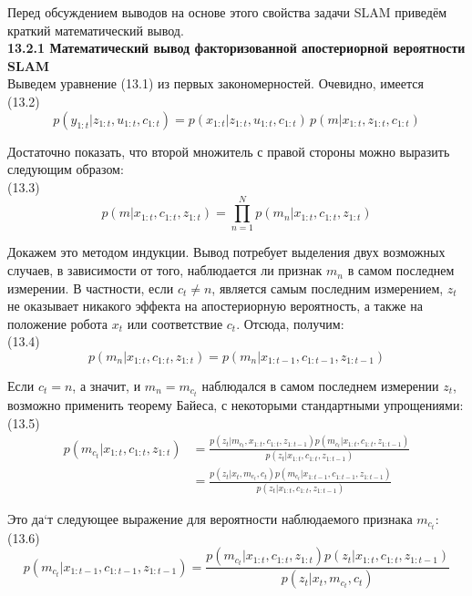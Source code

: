 \documentclass[10pt,a4paper]{article}
\begin{document}
Перед обсуждением выводов на основе этого свойства задачи SLAM приведём краткий математический вывод.\\

\textbf{13.2.1	Математический вывод факторизованной апостериорной вероятности SLAM }\\

Выведем уравнение (13.1) из первых закономерностей. Очевидно, имеется\\

(13.2)
$$p(y_{1:t}|z_{1:t},u_{1:t},c_{1:t})=p(x_{1:t}|z_{1:t},u_{1:t},c_{1:t})\,p(m|x_{1:t},z_{1:t},c_{1:t})$$

Достаточно показать, что второй множитель с правой стороны можно выразить следующим образом:\\

(13.3)
$$p(m|x_{1:t},c_{1:t},z_{1:t})=\prod_{n=1}^Np(m_n|x_{1:t},c_{1:t},z_{1:t})$$

Докажем это методом индукции. Вывод потребует выделения двух возможных случаев, в зависимости от того, наблюдается ли признак $m_n$ в самом последнем измерении. В частности, если $c_t\neq n$, является самым последним измерением, $z_t$ не оказывает никакого эффекта на апостериорную вероятность, а также на положение робота $x_t$ или соответствие $c_t$. Отсюда, получим:\\

(13.4)
$$p(m_n|x_{1:t},c_{1:t},z_{1:t})=p(m_n|x_{1:t-1},c_{1:t-1},z_{1:t-1})$$

Если $c_t=n$, а  значит, и $m_n = m_{c_t}$ наблюдался в самом последнем измерении $z_t$, возможно применить теорему Байеса, с некоторыми стандартными упрощениями:\\

(13.5)
\begin{equation*}
\begin{split}
p(m_{c_t}|x_{1:t},c_{1:t},z_{1:t})&=\frac{p(z_t|m_{c_t},x_{1:t},c_{1:t},z_{1:t-1})p(m_{c_t}|x_{1:t},c_{1:t},z_{1:t-1})}{p(z_t|x_{1:t},c_{1:t},z_{1:t-1})}\\
&=\frac{p(z_t|x_t,m_{c_t},c_t)p(m_{c_t}|x_{1:t-1},c_{1:t-1},z_{1:t-1})}{p(z_t|x_{1:t},c_{1:t},z_{1:t-1})}
\end{split}
\end{equation*}

Это да`т следующее выражение для вероятности наблюдаемого признака $m_{c_t}$:\\

(13.6)
$$p(m_{c_t}|x_{1:t-1},c_{1:t-1},z_{1:t-1})=\frac{p(m_{c_t}|x_{1:t},c_{1:t},z_{1:t})p(z_t|x_{1:t},c_{1:t},z_{1:t-1})}{p(z_t|x_t,m_{c_t},c_t)}$$
\end{document}
